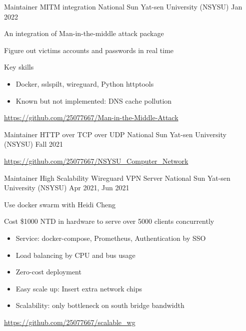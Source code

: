 \begin{cventries}
    \cventry
    {Maintainer}
    {MITM integration}
    {National Sun Yat-sen University (NSYSU)} %
    {Jan 2022} %
    {
        \begin{cvitems} %
            \item {An integration of Man-in-the-middle attack package}
            \item {Figure out victims accounts and passwords in real time}
            \item {Key skills}
            \begin{itemize}
                \item Docker, sslspilt, wireguard, Python httptools
                \item Known but not implemented: DNS cache pollution
            \end{itemize}
            \item {\url{https://github.com/25077667/Man-in-the-Middle-Attack}}
        \end{cvitems}
    }

    \cventry
    {Maintainer}
    {HTTP over TCP over UDP}
    {National Sun Yat-sen University (NSYSU)} %
    {Fall 2021} %
    {
        \begin{cvitems} %
            \item {}
            \item {\url{https://github.com/25077667/NSYSU_Computer_Network}}
        \end{cvitems}
    }

    \cventry
    {Maintainer}
    {High Scalability Wireguard VPN Server}
    {National Sun Yat-sen University (NSYSU)} %
    {Apr 2021, Jun 2021} %
    {
        \begin{cvitems} %
            \item {Use docker swarm with Heidi Cheng}
            \item {Cost \$1000 NTD in hardware to serve over 5000 clients concurrently}
            \begin{itemize}
                \item Service: docker-compose, Prometheus, Authentication by SSO
                \item Load balancing by CPU and bus usage
                \item Zero-cost deployment
                \item Easy scale up: Insert extra network chips
                \item Scalability: only bottleneck on south bridge bandwidth
            \end{itemize}
            \item {\url{https://github.com/25077667/scalable_wg}}
        \end{cvitems}
    }


\end{cventries}
